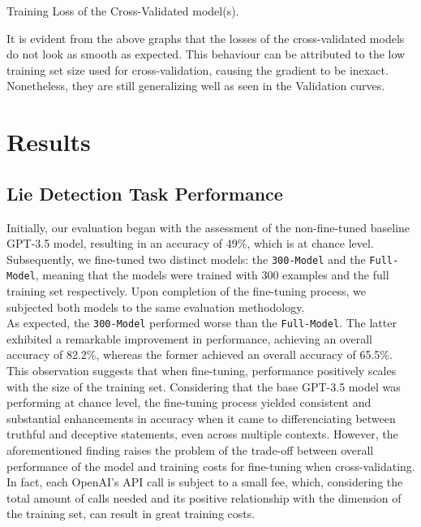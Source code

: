 \documentclass[10pt,twocolumn,letterpaper]{article}
\begin{document}
\begin{center}
    \small {Training Loss of the Cross-Validated model(s).} 
\end{center}

It is evident from the above graphs that the losses of the cross-validated models do not look as smooth as expected.
This behaviour can be attributed to the low training set size used for cross-validation, causing the gradient to be inexact.
Nonetheless, they are still generalizing well as seen in the Validation curves.

\section{Results}

\subsection{Lie Detection Task Performance}

Initially, our evaluation began with the assessment of the non-fine-tuned
baseline GPT-3.5 model, resulting in an accuracy of 49\%, which is at chance level. Subsequently,
we fine-tuned two distinct models: the \texttt{300-Model} and the \texttt{Full-Model}, meaning
that the models were trained with 300 examples and the full training set respectively.
Upon completion of the fine-tuning process, we subjected both models to the same evaluation methodology. \\

As expected, the \texttt{300-Model} performed worse than the \texttt{Full-Model}. The latter exhibited a 
remarkable improvement in performance, achieving an overall accuracy of 82.2\%, whereas the former achieved an overall accuracy of 65.5\%.
This observation suggests that when fine-tuning, performance positively scales with the size
of the training set. Considering that the base GPT-3.5 model was performing at chance level, the fine-tuning process
yielded consistent and substantial enhancements in accuracy when it came to differenciating
between truthful and deceptive statements, even across multiple contexts. 
However, the aforementioned finding raises the problem of the trade-off between overall performance of the model
and training costs for fine-tuning when cross-validating. In fact, each OpenAI's API call is subject to a small fee, which, considering 
the total amount of calls needed and its positive relationship with the dimension of the training set, can result in great training costs. \\
\end{document}
